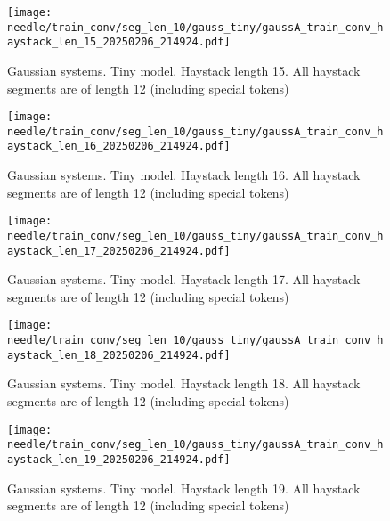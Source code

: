\begin{figure}[h]
    \centering
    \texttt{[image: needle/train\_conv/seg\_len\_10/gauss\_tiny/gaussA\_train\_conv\_haystack\_len\_15\_20250206\_214924.pdf]}
    \caption{Gaussian systems. Tiny model. Haystack length 15. All haystack segments are of length 12 (including special tokens)}
    \label{fig:gauss_tiny_needle_train_conv_haystack_len_15_all_haystack_len_12}

\end{figure}

\begin{figure}[h]
    \centering
    \texttt{[image: needle/train\_conv/seg\_len\_10/gauss\_tiny/gaussA\_train\_conv\_haystack\_len\_16\_20250206\_214924.pdf]}
    \caption{Gaussian systems. Tiny model. Haystack length 16. All haystack segments are of length 12 (including special tokens)}
    \label{fig:gauss_tiny_needle_train_conv_haystack_len_16_all_haystack_len_12}

\end{figure}

\begin{figure}[h]
    \centering
    \texttt{[image: needle/train\_conv/seg\_len\_10/gauss\_tiny/gaussA\_train\_conv\_haystack\_len\_17\_20250206\_214924.pdf]}
    \caption{Gaussian systems. Tiny model. Haystack length 17. All haystack segments are of length 12 (including special tokens)}
    \label{fig:gauss_tiny_needle_train_conv_haystack_len_17_all_haystack_len_12}

\end{figure}

\begin{figure}[h]
    \centering
    \texttt{[image: needle/train\_conv/seg\_len\_10/gauss\_tiny/gaussA\_train\_conv\_haystack\_len\_18\_20250206\_214924.pdf]}
    \caption{Gaussian systems. Tiny model. Haystack length 18. All haystack segments are of length 12 (including special tokens)}
    \label{fig:gauss_tiny_needle_train_conv_haystack_len_18_all_haystack_len_12}

\end{figure}

\begin{figure}[h]
    \centering
    \texttt{[image: needle/train\_conv/seg\_len\_10/gauss\_tiny/gaussA\_train\_conv\_haystack\_len\_19\_20250206\_214924.pdf]}
    \caption{Gaussian systems. Tiny model. Haystack length 19. All haystack segments are of length 12 (including special tokens)}
    \label{fig:gauss_tiny_needle_train_conv_haystack_len_19_all_haystack_len_12}

\end{figure}




